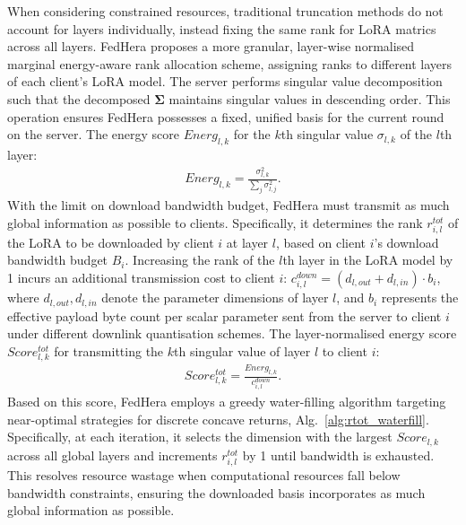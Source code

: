 \documentclass{article}
\begin{document}
When considering constrained resources, traditional truncation methods do not account for layers individually, instead fixing the same rank for LoRA matrics across all layers. FedHera proposes a more granular, layer-wise normalised marginal energy-aware rank allocation scheme, assigning ranks to different layers of each client's LoRA model. The server performs singular value decomposition such that the decomposed $\mathbf{\Sigma}$ maintains singular values in descending order. This operation ensures FedHera possesses a fixed, unified basis for the current round on the server. The energy score $Energ_{l,k}$ for the $k$th singular value $\sigma_{l,k}$ of the $l$th layer:
\begin{align}
    Energ_{l, k} = \frac{\sigma_{l,k}^{2}}{\sum_{j}{\sigma_{l,j}^{2}}}.
\end{align}
With the limit on download bandwidth budget, FedHera must transmit as much global information as possible to clients. Specifically, it determines the rank $r^{tot}_{i, l}$ of the LoRA to be downloaded by client $i$ at layer $l$, based on client $i$'s download bandwidth budget $B_{i}$. Increasing the rank of the $l$th layer in the LoRA model by 1 incurs an additional transmission cost to client $i$: $c_{i,l}^{down} = (d_{l, out} + d_{l, in}) \cdot b_{i}$, where $d_{l, out}, d_{l, in}$ denote the parameter dimensions of layer $l$, and $b_{i}$ represents the effective payload byte count per scalar parameter sent from the server to client $i$ under different downlink quantisation schemes. The layer-normalised energy score $Score_{l,k}^{tot}$ for transmitting the $k$th singular value of layer $l$ to client $i$:
\begin{align}
    Score_{l,k}^{tot} = \frac{Energ_{l, k}}{c_{i,l}^{down}}.
\end{align}
Based on this score, FedHera employs a greedy water-filling algorithm targeting near-optimal strategies for discrete concave returns, Alg.~\ref{alg:rtot_waterfill}. Specifically, at each iteration, it selects the dimension with the largest $Score_{l,k}$ across all global layers and increments $r^{tot}_{i, l}$ by 1 until bandwidth is exhausted. This resolves resource wastage when computational resources fall below bandwidth constraints, ensuring the downloaded basis incorporates as much global information as possible.
\end{document}

